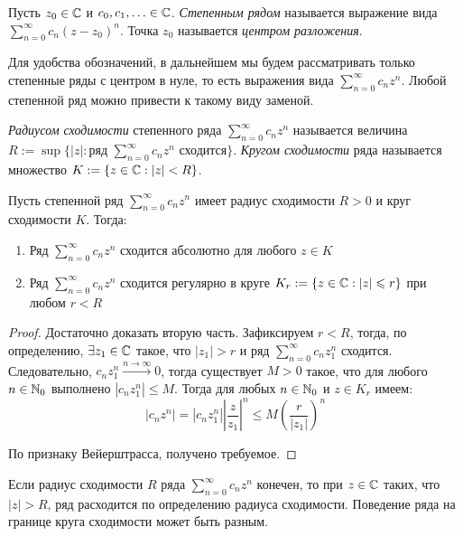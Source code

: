 \begin{definition}
	Пусть $z_0 \in \mathbb{C}$ и $c_0, c_1, \dotsc \in \mathbb{C}$. \textit{Степенным рядом} называется выражение вида $\sum_{n=0}^\infty c_n(z - z_0)^n$. Точка $z_0$ называется \textit{центром разложения}.
\end{definition}

\begin{note}
	Для удобства обозначений, в дальнейшем мы будем рассматривать только степенные ряды с центром в нуле, то есть выражения вида $\sum_{n=0}^\infty c_nz^n$. Любой степенной ряд можно привести к такому виду заменой.
\end{note}

\pagebreak

\begin{definition}
	\textit{Радиусом сходимости} степенного ряда $\sum_{n=0}^\infty c_nz^n$ называется величина $R := \sup\{|z| : \text{ряд }\sum_{n=0}^\infty c_nz^n\text{ сходится}\}$. \textit{Кругом сходимости} ряда называется множество $K := \{z \in \mathbb{C} : |z| < R\}$.
\end{definition}

\begin{theorem}[Абеля]
	Пусть степенной ряд $\sum_{n=0}^\infty c_nz^n$ имеет радиус сходимости $R > 0$ и круг сходимости $K$. Тогда:
	\begin{enumerate}
		\item Ряд $\sum_{n=0}^\infty c_nz^n$ сходится абсолютно для любого $z \in K$
		\item Ряд $\sum_{n=0}^\infty c_nz^n$ сходится регулярно в круге $K_r := \{z \in \mathbb{C}: |z| \leqslant r\}$ при любом $r < R$
	\end{enumerate}
\end{theorem}

\begin{proof}
	Достаточно доказать вторую часть. Зафиксируем $r < R$, тогда, по определению, $\exists z_1 \in \mathbb{C}$ такое, что $|z_1| > r$ и ряд $\sum_{n=0}^\infty c_nz_1^n$ сходится. Следовательно, $c_nz_1^n \xrightarrow{n \to \infty} 0$, тогда существует $M > 0$ такое, что для любого $n \in \mathbb{N}_0$ выполнено $|c_nz_1^n| \le M$. Тогда для любых $n \in \mathbb{N}_0$ и $z \in K_r$ имеем:
	\[|c_nz^n| = \left|c_nz_1^n\right|\left|\frac{z}{z_1}\right|^n \le M\left(\frac{r}{|z_1|}\right)^n\]
	
	По признаку Вейерштрасса, получено требуемое.
\end{proof}

\begin{note}
	Если радиус сходимости $R$ ряда $\sum_{n=0}^\infty c_nz^n$ конечен, то при $z \in \mathbb{C}$ таких, что $|z| > R$, ряд расходится по определению радиуса сходимости. Поведение ряда на границе круга сходимости может быть разным.
\end{note}

